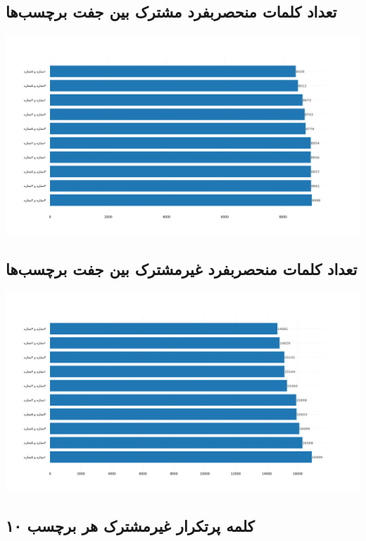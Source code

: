 {\subsection{تعداد کلمات منحصربفرد مشترک بین جفت برچسب‌ها}
{
\begin{center}
\includegraphics[scale=0.4]{Images/com_words_cnt.png}
\end{center}
\begin{adjustbox}{width=\textwidth}
\end{adjustbox}
}
\newpage
\subsection{تعداد کلمات منحصربفرد غیرمشترک بین جفت برچسب‌ها}
{
\begin{center}
\includegraphics[scale=0.4]{Images/uncom_words_cnt.png}
\end{center}
\begin{adjustbox}{width=\textwidth}
\end{adjustbox}
}
\newpage
\subsection{۱۰ کلمه پرتکرار غیرمشترک هر برچسب}
{ \selectfont
}}
